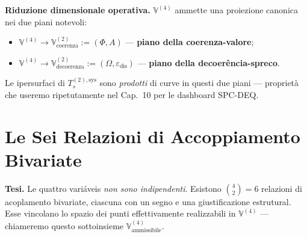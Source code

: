 \Hypoth{} \textbf{Riduzione dimensionale operativa.}
\(\mathbb{V}^{(4)}\) ammette una proiezione canonica nei due piani
notevoli:

\begin{itemize}
\tightlist
\item
  \(\mathbb{V}^{(4)} \to \mathbb{V}^{(2)}_{\text{coerenza}} := (\Phi, A)\)
  --- \textbf{piano della coerenza-valore};
\item
  \(\mathbb{V}^{(4)} \to \mathbb{V}^{(2)}_{\text{decoerenza}} := (\Omega, \varepsilon_{\text{dis}})\)
  --- \textbf{piano della decoerência-spreco}.
\end{itemize}

Le ipersurfaci di \(T_s^{(2),\text{sys}}\) sono \emph{prodotti} di curve
in questi due piani --- proprietà che useremo ripetutamente nel Cap.~10
per le dashboard SPC-DEQ.



\section{Le Sei Relazioni di Accoppiamento
Bivariate}\label{le-sei-relazioni-di-acoplamento-bivariate}

\Hypoth{} \textbf{Tesi.} Le quattro variáveis \emph{non sono
indipendenti}. Esistono \(\binom{4}{2} = 6\) relazioni di acoplamento
bivariate, ciascuna con un segno e una giustificazione estrutural. Esse
vincolano lo spazio dei punti effettivamente realizzabili in
\(\mathbb{V}^{(4)}\) --- chiameremo questo sottoinsieme
\(\mathbb{V}^{(4)}_{\text{ammissibile}}\).

